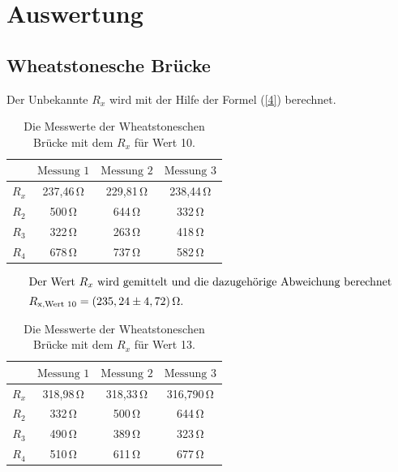 \section{Auswertung} 

\subsection{Wheatstonesche Brücke}
\begin{flushleft}
    Der Unbekannte $R_{x}$ wird mit der Hilfe der Formel (\ref{4}) berechnet. 
\end{flushleft}

\begin{table}[H]
    \centering
    \caption{Die Messwerte der Wheatstoneschen Brücke mit dem $R_{x}$ für Wert 10. }
    \label{Tabelle1}
    \begin{tabular} {c  c  c  c}
        \toprule
        {$ $} &
        {$ \text{Messung 1} $} &
        {$ \text{Messung 2} $} &
        {$ \text{Messung 3} $} \\
        \midrule
        $R_{x}$ & 237,46\,\unit{\ohm} & 229,81\,\unit{\ohm} & 238,44\,\unit{\ohm}  \\
        $R_{2}$ & 500\,\unit{\ohm}    & 644\,\unit{\ohm}    & 332\,\unit{\ohm}     \\
        $R_{3}$ & 322\,\unit{\ohm}    & 263\,\unit{\ohm}    & 418\,\unit{\ohm}     \\
        $R_{4}$ & 678\,\unit{\ohm}    & 737\,\unit{\ohm}    & 582\,\unit{\ohm}     \\
        \bottomrule
    \end{tabular} 
\end{table}

\begin{align*}
    \intertext{Der Wert $R_{x}$ wird gemittelt und die dazugehörige Abweichung berechnet}
    R_{\text{x,Wert 10}} = (235,24 \pm 4,72)\,\unit{\ohm}.
\end{align*}

\begin{table}[H]
    \centering
    \caption{Die Messwerte der Wheatstoneschen Brücke mit dem $R_{x}$ für Wert 13. }
    \label{Tabelle2}
    \begin{tabular} {c  c  c  c}
        \toprule
        {$ $} &
        {$ \text{Messung 1} $} &
        {$ \text{Messung 2} $} &
        {$ \text{Messung 3} $} \\
        \midrule
        $R_{x}$ & 318,98\,\unit{\ohm} & 318,33\,\unit{\ohm} & 316,790\,\unit{\ohm}  \\
        $R_{2}$ & 332\,\unit{\ohm}    & 500\,\unit{\ohm}    & 644\,\unit{\ohm}     \\
        $R_{3}$ & 490\,\unit{\ohm}    & 389\,\unit{\ohm}    & 323\,\unit{\ohm}     \\
        $R_{4}$ & 510\,\unit{\ohm}    & 611\,\unit{\ohm}    & 677\,\unit{\ohm}     \\
        \bottomrule
    \end{tabular} 
\end{table}

